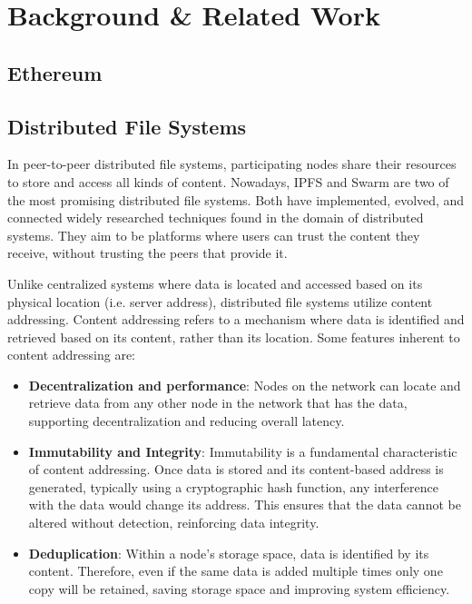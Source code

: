 \chapter{Background \& Related Work}\label{chapter:background}

\section{Ethereum}\label{sec:ethereum}
\section{Distributed File Systems}\label{sec:dfs}
In peer-to-peer distributed file systems, participating nodes share their resources to store and access all kinds of content. Nowadays, IPFS and Swarm are two of the most promising distributed file systems. Both have implemented, evolved, and connected widely researched techniques found in the domain of distributed systems. They aim to be platforms where users can trust the content they receive, without trusting the peers that provide it.

Unlike centralized systems where data is located and accessed based on its physical location (i.e. server address), distributed file systems utilize content addressing. Content addressing \citep{trautwein_2022} refers to a mechanism where data is identified and retrieved based on its content, rather than its location. Some features inherent to content addressing are:

\begin{itemize}
    \item \textbf{Decentralization and performance}: Nodes on the network can locate and retrieve data from any other node in the network that has the data, supporting decentralization and reducing overall latency.
    \item \textbf{Immutability and Integrity}: Immutability is a fundamental characteristic of content addressing. Once data is stored and its content-based address is generated, typically using a cryptographic hash function, any interference with the data would change its address. This ensures that the data cannot be altered without detection, reinforcing data integrity.
    \item \textbf{Deduplication}: Within a node's storage space, data is identified by its content. Therefore, even if the same data is added multiple times only one copy will be retained, saving storage space and improving system efficiency.
\end{itemize}

